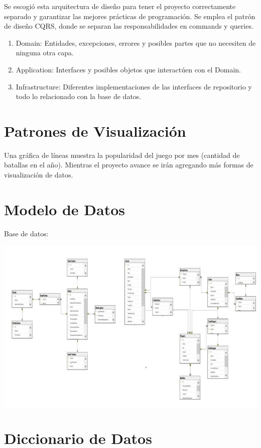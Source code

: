 \documentclass[15pt,a4paper]{article}
\begin{document}
Se escogió esta arquitectura de diseño para tener el proyecto correctamente separado y 
garantizar las mejores prácticas de programación. Se emplea el patrón de diseño CQRS, 
donde se separan las responsabilidades en commands y queries.
\begin{enumerate}
\item Domain: Entidades, excepciones, errores y posibles partes que no necesiten de ninguna 
otra capa.
\item Application: Interfaces y posibles objetos que interactúen con el Domain.
\item Infrastructure: Diferentes implementaciones de las interfaces de repositorio y todo lo 
relacionado con la base de datos.
\end{enumerate}

\section{Patrones de Visualización}
Una gráfica de líneas muestra la popularidad del juego por mes (cantidad de batallas en 
el año). Mientras el proyecto avance se irán agregando más formas de visualización de 
datos.

\section{Modelo de Datos}
Base de datos:
\begin{center}
\includegraphics[width=1\textwidth]{bd}
\end{center}

\section{Diccionario de Datos}
\end{document}
